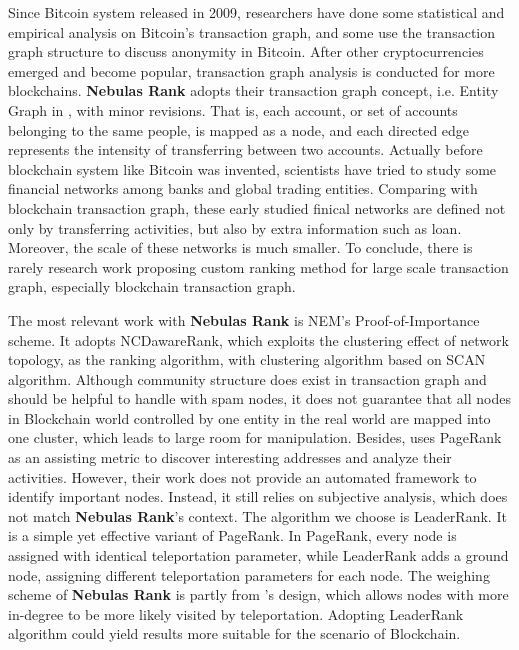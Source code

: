 Since Bitcoin\cite{Nakamoto2008} system released in 2009, researchers have done some statistical and empirical analysis on Bitcoin's transaction graph\cite{Ron}\cite{Haslhofer}\cite{NielKondor2014}\cite{Baumann2014}, and some use the transaction graph structure to discuss anonymity in Bitcoin\cite{Meiklejohn2013}\cite{Ober2013}\cite{pham2016anomaly}\cite{Fleder2015}\cite{Ferrin2015}. After other cryptocurrencies emerged and become popular, transaction graph analysis is conducted for more blockchains\cite{Chang2017}\cite{Anderson2016}. \textbf{Nebulas Rank} adopts their transaction graph concept, i.e. Entity Graph in \cite{Tschorsch2015}, with minor revisions. That is, each account, or set of accounts belonging to the same people, is mapped as a node, and each directed edge represents the intensity of transferring between two accounts. Actually before blockchain system like Bitcoin was invented, scientists have tried to study some financial networks among banks and global trading entities\cite{propper2008towards}\cite{Boss2004}\cite{Serrano2007}\cite{Bech2008}\cite{Fagiolo2009}\cite{Morten2006}\cite{Boss2004a}\cite{Krempel2002}\cite{Serrano2003}. Comparing with blockchain transaction graph, these early studied finical networks are defined not only by transferring activities, but also by extra information such as loan. Moreover, the scale of these networks is much smaller. To conclude, there is rarely research work proposing custom ranking method for large scale transaction graph, especially blockchain transaction graph.

The most relevant work with \textbf{Nebulas Rank} is NEM\cite{nem}'s Proof-of-Importance scheme. It adopts NCDawareRank\cite{Nikolakopoulos2013}, which exploits the clustering effect of network topology, as the ranking algorithm, with clustering algorithm based on SCAN algorithm\cite{xu2007scan}\cite{shiokawa2015scan}\cite{chang2017mathsf}. Although community structure does exist in transaction graph and should be helpful to handle with spam nodes, it does not guarantee that all nodes in Blockchain world controlled by one entity in the real world are mapped into one cluster, which leads to large room for manipulation. Besides, \textcite{Fleder2015} uses PageRank\cite{Brin2010}\cite{page1999pagerank} as an assisting metric to discover interesting addresses and analyze their activities. However, their work does not provide an automated framework to identify important nodes. Instead, it still relies on subjective analysis, which does not match \textbf{Nebulas Rank}'s context. The algorithm we choose is LeaderRank\cite{Chen2013}\cite{Li2014}. It is a simple yet effective variant of PageRank\cite{Brin2010}\cite{page1999pagerank}. In PageRank, every node is assigned with identical teleportation parameter, while LeaderRank adds a ground node, assigning different teleportation parameters for each node. The weighing scheme of \textbf{Nebulas Rank} is partly from \textcite{Li2014}'s design, which allows nodes with more in-degree to be more likely visited by teleportation. Adopting LeaderRank algorithm could yield results more suitable for the scenario of Blockchain.

